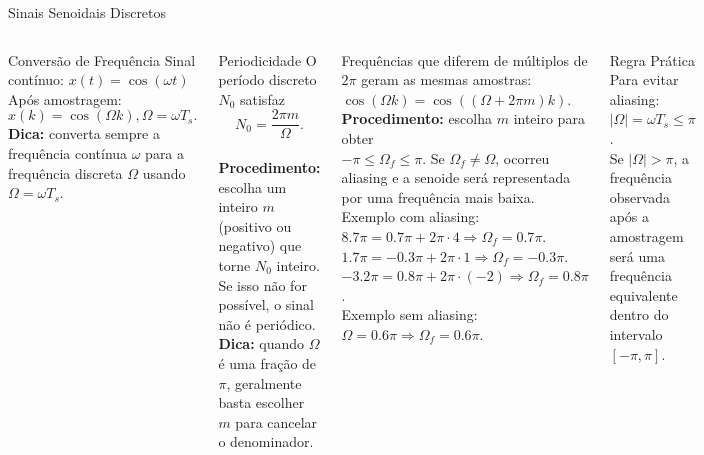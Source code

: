 \begin{frame}{Sinais Senoidais Discretos}
  \scriptsize
  \begin{columns}
    \begin{block}{Conversão de Frequência}
      Sinal contínuo:
      $x(t)=\cos(\omega t)$
      Após amostragem:
      $$
      x(k)=\cos(\Omega k), \Omega=\omega T_s.
      $$
      \textbf{Dica:}
      converta sempre a frequência contínua $\omega$ para a frequência discreta $\Omega$ usando $\Omega=\omega T_s$.
    \end{block}
    \begin{block}{Periodicidade}
      O período discreto $N_0$ satisfaz \\
      $$N_0=\frac{2\pi m}{\Omega}.$$ \\
      \textbf{Procedimento:}
      escolha um inteiro $m$ (positivo ou negativo) que torne $N_0$ inteiro.
      Se isso não for possível, o sinal não é periódico. \\
      \textbf{Dica:}
      quando $\Omega$ é uma fração de $\pi$, geralmente basta escolher $m$ para cancelar o denominador.
    \end{block}
    Frequências que diferem de múltiplos de $2\pi$ geram as mesmas amostras: \\
    $\cos(\Omega k)=\cos((\Omega+2\pi m)k)$.
    \vspace{0.2cm} \\
    \textbf{Procedimento:}
    escolha $m$ inteiro para obter \\
    $-\pi\le\Omega_f\le\pi$.
    Se $\Omega_f\neq\Omega$, ocorreu aliasing e a senoide será representada por uma frequência mais baixa.
    \vspace{0.2cm} \\
    Exemplo com aliasing: \\
    $8.7\pi=0.7\pi+2\pi\cdot4 \Rightarrow \Omega_f=0.7\pi$. \\
    $1.7\pi=-0.3\pi+2\pi\cdot1 \Rightarrow \Omega_f=-0.3\pi$. \\
    $-3.2\pi=0.8\pi+2\pi\cdot(-2) \Rightarrow \Omega_f=0.8\pi$. \\
    Exemplo sem aliasing: \\
    $\Omega=0.6\pi \Rightarrow \Omega_f=0.6\pi$.
    \begin{block}{Regra Prática}
      Para evitar aliasing: \\
      $|\Omega|=\omega T_s\le\pi$. \\
      Se $|\Omega|>\pi$, a frequência observada após a amostragem será uma frequência equivalente dentro do intervalo $[-\pi,\pi]$.
    \end{block}
  \end{columns}
\end{frame}


